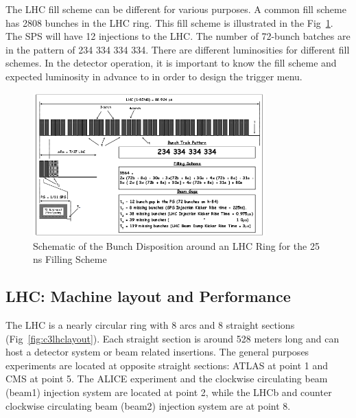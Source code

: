 The LHC fill scheme can be different for various purposes. A common fill scheme has 2808 bunches in the LHC ring. This fill scheme is illustrated in the Fig~\ref{fig:c3lhcfillscheme}. The SPS will have 12 injections to the LHC. The number of 72-bunch batches are in the pattern of 234 334 334 334. There are different luminosities for different fill schemes. In the detector operation, it is important to know the fill scheme and expected luminosity in advance to in order to design the trigger menu. 

\begin{figure}[htbp]
 \begin{center}
  \includegraphics[width=0.8\textwidth]{figures/c3/c3_lhc_fillscheme.png}
 \end{center}
 \caption{Schematic of the Bunch Disposition around an LHC Ring for the 25 ns Filling Scheme}
 \label{fig:c3lhcfillscheme}
\end{figure}

\clearpage
\subsection{LHC: Machine layout and Performance}

The LHC is a nearly circular ring with 8 arcs and 8 straight sections (Fig~\ref{fig:c3lhclayout}). Each straight section is around 528 meters long and can host a detector system or beam related insertions. The general purposes experiments are located at opposite straight sections: ATLAS at point 1 and CMS at point 5. The ALICE experiment and the clockwise circulating beam (beam1) injection system are located at point 2, while the LHCb and counter clockwise circulating beam (beam2) injection system are at point 8. 

